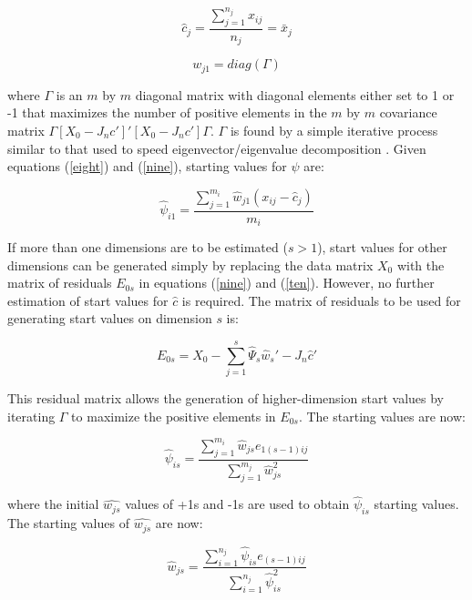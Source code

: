 \documentclass[nojss]{jss}
\begin{document}
\begin{equation}
\hat{c}_{j} = \frac{\displaystyle\sum\limits_{j=1}^{n_j} x_{ij}}{n_j} = \bar{x}_j
\label{eight}
\end{equation}

\begin{equation}
w_{j1} = diag(\Gamma)
\label{nine}
\end{equation}

\noindent where $\Gamma$ is an $m$ by $m$ diagonal matrix with diagonal elements either set to 1 or -1
that maximizes the number of positive elements in the $m$ by $m$ covariance matrix
$\Gamma[X_0 - J_nc']\mathrm{'}[X_0 - J_nc']\Gamma$. $\Gamma$ is found by a simple iterative process
similar to that used to speed eigenvector/eigenvalue decomposition \citep{poole1998recovering}. Given equations (\ref{eight})
and (\ref{nine}), starting values for $\psi$ are:

\begin{equation}
\hat{\psi}_{i1} = \frac{\displaystyle\sum\limits_{j=1}^{m_i} \hat{w}_{j1}(x_{ij}-\hat{c}_j)}{m_i}
\label{ten}
\end{equation}

If more than one dimensions are to be estimated ($s > 1$), start values for other dimensions can be generated
simply by replacing the data matrix $X_0$ with the matrix of residuals $E_{0s}$ in equations (\ref{nine}) and (\ref{ten}). However, no further estimation of start values for $\hat{c}$ is required. The matrix of residuals to be used for generating start values on dimension $s$ is:

$$E_{0s} = X_0 - \displaystyle\sum\limits_{j=1}^{s} \hat{\Psi}_s\hat{w}_s\mathrm{'} - J_n\hat{c}'$$

This residual matrix allows the generation of higher-dimension start values by iterating $\Gamma$ to
maximize the positive elements in $E_{0s}$. The starting values are now:

\begin{equation}
\hat{\psi}_{is} = \frac{\displaystyle\sum\limits_{j=1}^{m_i} \hat{w}_{js}e_{1(s-1)ij}}{\sum\limits_{j=1}^{m_j} \hat{w}_{js}^2}
\label{eleven}
\end{equation}

\noindent where the initial $\hat{w_{js}}$ values of +1s and -1s are used to obtain $\hat{\psi}_{is}$ starting values. The starting values of $\hat{w_{js}}$ are now:

\begin{equation}
\hat{w}_{js} = \frac{\displaystyle\sum\limits_{i=1}^{n_j} \hat{\psi}_{is}e_{(s-1)ij}}{\sum\limits_{i=1}^{n_j} \hat{\psi}_{is}^2}
\label{twelve}
\end{equation}
\end{document}
